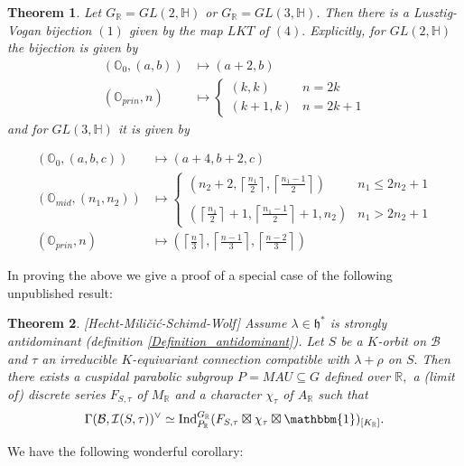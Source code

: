 \documentclass[letterpaper,twosided,11pt]{article}
\theoremstyle{plain}
\newtheorem{theorem}{Theorem}[section]
\theoremstyle{definition}
\theoremstyle{remark}
\newcommand{\HH}{\mathbb{H}}
\newcommand{\R}{\mathbb{R}}
\newcommand{\OO}{\mathbb{O}}
\newcommand{\Ind}{\operatorname{Ind}}
\newcommand{\lie}[1]{\mathfrak{#1}}
\begin{document}
\begin{theorem} 
	Let $G_\R=GL(2,\HH)$ or $G_\R=GL(3,\HH).$ Then there is a Lusztig-Vogan bijection $(1)$ given by the map $LKT$ of $(4).$ Explicitly, for $GL(2,\HH)$ the bijection is given by \begin{align*}
 (\OO_0,(a,b))&\mapsto (a+2,b) \\ (\OO_{prin},n)&\mapsto \begin{cases}  (k,k) & n=2k \\ (k+1,k) & n=2k+1
 \end{cases} 
 \end{align*} 
 and for $GL(3,\HH)$ it is given by 

\begin{align*}
(\OO_0,(a,b,c))&\mapsto (a+4,b+2,c) \\  
(\OO_{mid}, (n_1,n_2))& \mapsto {\begin{cases} \left(n_2+2,\left \lceil \frac{n_1}{2} \right\rceil, \left \lceil \frac{n_1-1}{2} \right\rceil\right) & n_1\leq 2n_2+1 \\ \; \\ \left(\left \lceil \frac{n_1}{2} \right\rceil+1, \left \lceil \frac{n_1-1}{2} \right\rceil+1, n_2\right) & n_1>2n_2+1\end{cases}  } \\ 
 (\OO_{prin},n)&\mapsto \left( \left \lceil \frac{n}{3} \right\rceil, \left \lceil \frac{n-1}{3} \right\rceil, \left \lceil \frac{n-2}{3} \right\rceil  \right) \end{align*} 
\end{theorem} 	 
In proving the above we give a proof of a special case of the following unpublished result: 

\begin{theorem}\label{Global_Sections_Introduction}[Hecht-Mili\v{c}i\'{c}-Schimd-Wolf]
	Assume $\lambda\in \lie{h}^*$ is strongly antidominant (definition \ref{Definition_antidominant}). Let $S$ be a $K$-orbit on $\mathcal{B}$ and $\tau$ an irreducible $K$-equivariant connection compatible with $\lambda+\rho$ on $S.$ Then there exists a cuspidal parabolic subgroup $P=MAU\subseteq G$ defined over $\R,$ a (limit of) discrete series $F_{S,\tau}$ of $M_\R$ and a character $\chi_\tau$ of $A_\R$ such that \[ \Gamma(\mathcal{B}, \mathcal{I}(S,\tau))^\vee \simeq \Ind_{P_\R}^{G_\R}(F_{S,\tau}\boxtimes \chi_\tau \boxtimes \mathbbm{1})_{[K_\R]}. \]
	   
\end{theorem}
We have the following wonderful corollary: 
\end{document}
